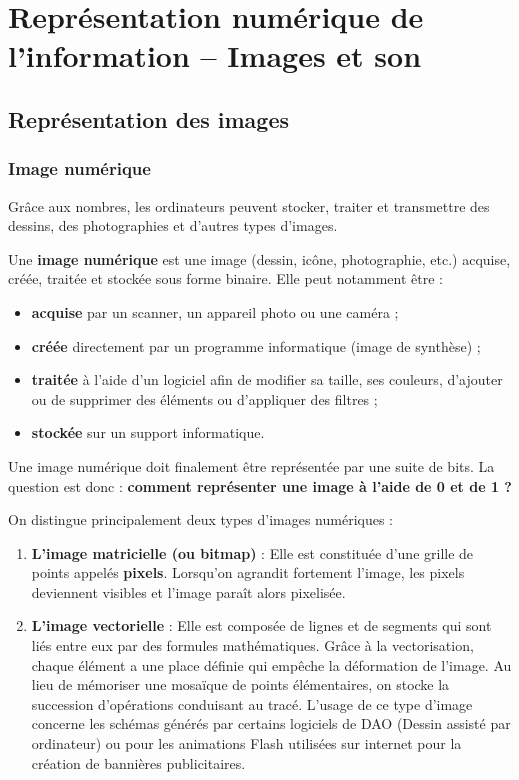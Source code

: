 \documentclass[11pt, a4paper]{book}
\begin{document}
\setcounter{chapter}{1}
\chapter{Représentation numérique de l'information -- Images et son}

\section{Représentation des images}

\subsection{Image numérique}

Grâce aux nombres, les ordinateurs peuvent stocker, traiter et transmettre des dessins,
des photographies et d'autres types d'images.

Une \textbf{image numérique} est une image (dessin, icône, photographie, etc.) acquise,
créée, traitée et stockée sous forme binaire. Elle peut notamment être :
\begin{itemize}
    \item \textbf{acquise} par un scanner, un appareil photo ou une caméra ;
    \item \textbf{créée} directement par un programme informatique (image de synthèse) ;
    \item \textbf{traitée} à l'aide d'un logiciel afin de modifier sa taille, ses couleurs,
    d'ajouter ou de supprimer des éléments ou d'appliquer des filtres ;
    \item \textbf{stockée} sur un support informatique.
\end{itemize}

\begin{remarqueBox}
Une image numérique doit finalement être représentée par une suite de bits.
La question est donc : \textbf{comment représenter une image à l'aide de 0 et de 1 ?}
\end{remarqueBox}

On distingue principalement deux types d'images numériques :
\begin{enumerate}
    \item \textbf{L'image matricielle (ou bitmap)} : Elle est constituée d'une grille de
    points appelés \textbf{pixels}. Lorsqu'on agrandit fortement l'image, les pixels
    deviennent visibles et l'image paraît alors pixelisée.
    \item \textbf{L'image vectorielle} : Elle est composée de lignes et de segments qui sont liés entre eux par
des formules mathématiques. Grâce à la vectorisation, chaque élément a une place définie qui
empêche la déformation de l’image. Au lieu de mémoriser une mosaïque de points élémentaires,
on stocke la succession d’opérations conduisant au tracé.
L’usage de ce type d’image concerne les schémas générés par certains logiciels de DAO (Dessin
assisté par ordinateur) ou pour les animations Flash utilisées sur internet pour la création de
bannières publicitaires.
\end{enumerate}
\end{document}

